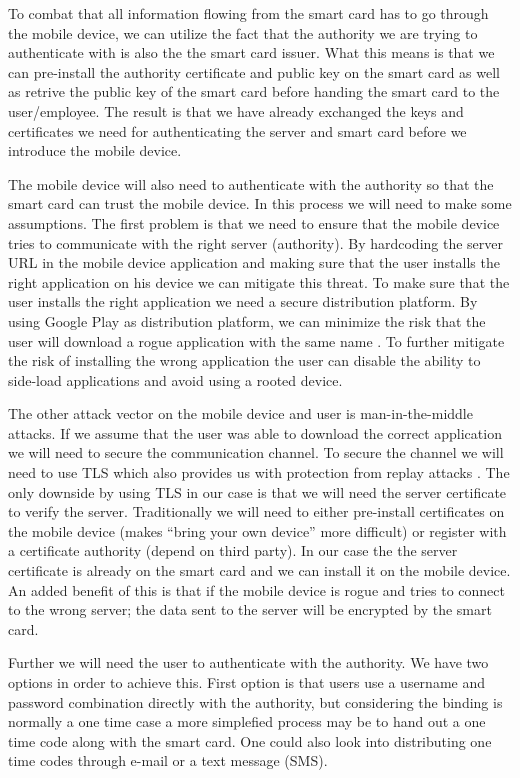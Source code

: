 To combat that all information flowing from the smart card has to go through the mobile device, we can utilize the fact that the authority we are trying to authenticate with is also the the smart card issuer. What this means is that we can pre-install the authority certificate and public key on the smart card as well as retrive the public key of the smart card before handing the smart card to the user/employee. The result is that we have already exchanged the keys and certificates we need for authenticating the server and smart card before we introduce the mobile device.

The mobile device will also need to authenticate with the authority so that the smart card can trust the mobile device. In this process we will need to make some assumptions. The first problem is that we need to  ensure that the mobile device tries to communicate with the right server (authority). By hardcoding the server URL in the mobile device application and making sure that the user installs the right application on his device we can mitigate this threat. To make sure that the user installs the right application we need a secure distribution platform. By using Google Play as distribution platform, we can minimize the risk that the user will download a rogue application with the same name \cite{googlePlaySecureDist}. To further mitigate the risk of installing the wrong application the user can disable the ability to side-load applications and avoid using a rooted device.

The other attack vector on the mobile device and user is man-in-the-middle attacks. If we assume that the user was able to download the correct application we will need to secure the communication channel. To secure the channel we will need to use TLS \cite{rfc793} which also provides us with protection from replay attacks \cite{tlsOWASP}. The only downside by using TLS in our case is that we will need the server certificate to verify the server. Traditionally we will need to either pre-install certificates on the mobile device (makes ``bring your own device'' more difficult) or register with a certificate authority (depend on third party). In our case the the server certificate is already on the smart card and we can install it on the mobile device. An added benefit of this is that if the mobile device is rogue and tries to connect to the wrong server; the data sent to the server will be encrypted by the smart card.

Further we will need the user to authenticate with the authority. We have two options in order to achieve this. First option is that users use a username and password combination directly with the authority, but considering the binding is normally a one time case a more simplefied process may be to hand out a one time code along with the smart card. One could also look into distributing one time codes through e-mail or a text message (SMS).

